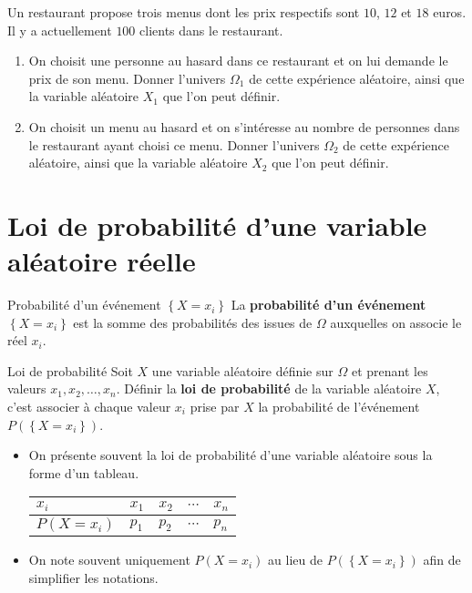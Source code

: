 \documentclass[11pt]{article}
\begin{document}
\begin{app}
  Un restaurant propose trois menus dont les prix respectifs sont $10$, $12$ et
  $18$ euros. Il y a actuellement $100$ clients dans le restaurant.
  \begin{enumerate}
    \item On choisit une personne au hasard dans ce restaurant et on lui
      demande le prix de son menu. Donner l'univers $\Omega_1$ de cette
      expérience aléatoire, ainsi que la variable aléatoire $X_1$ que l'on peut
      définir.
    \item On choisit un menu au hasard et on s'intéresse au nombre de personnes
      dans le restaurant ayant choisi ce menu. Donner l'univers $\Omega_2$ de
      cette expérience aléatoire, ainsi que la variable aléatoire $X_2$ que l'on
      peut définir.
  \end{enumerate}
\end{app}

\section{Loi de probabilité d'une variable aléatoire réelle}

\begin{defi}{Probabilité d'un événement $\left\{ X=x_i \right\}$}
  La \textbf{probabilité d'un événement} $\left\{ X=x_i \right\}$ est la somme
  des probabilités des issues de $\Omega$ auxquelles on associe le réel $x_i$.
\end{defi}

\begin{defi}{Loi de probabilité}
  Soit $X$ une variable aléatoire définie sur $\Omega$ et prenant les valeurs
  $x_1, x_2, \ldots, x_n$. Définir la
  \textbf{loi de probabilité} de la variable aléatoire $X$, c'est associer à
  chaque valeur $x_i$ prise par $X$ la probabilité de l'événement $P\left(
  \left\{ X=x_i \right\}\right)$.
\end{defi}

\begin{rmq}
  \begin{itemize}
    \item On présente souvent la loi de probabilité d'une variable aléatoire
      sous la forme d'un tableau.
      \begin{center}
        \renewcommand{\arraystretch}{1.2}
        \begin{tabularx}{.7\textwidth}{|Y|Y|Y|Y|Y|}
          \hline
          $x_i$ & $x_1$ & $x_2$ & $\cdots$ & $x_n$ \\
          \hline
          $P\left( X=x_i \right)$ & $p_1$ & $p_2$ & $\cdots$ & $p_n$ \\
          \hline
        \end{tabularx}
      \end{center}
    \item On note souvent uniquement $P(X=x_i)$ au lieu de $P\left( \left\{
        X=x_i\right\}\right)$ afin de simplifier les notations.
  \end{itemize}
\end{rmq}
\end{document}
